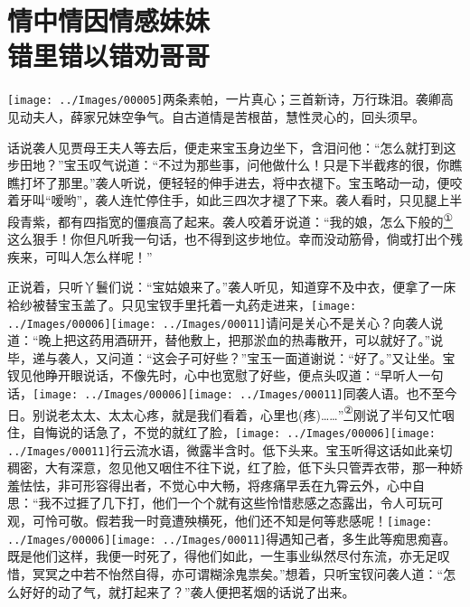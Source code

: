 

\chapter{情中情因情感妹妹\\错里错以错劝哥哥}\label{part0038_split_000.htmlux5cux23calibre_pb_0}

{\texttt{[image: ../Images/00005]}两条素帕，一片真心；三首新诗，万行珠泪。袭卿高见动夫人，薛家兄妹空争气。自古道情是苦根苗，慧性灵心的，回头须早。}

话说袭人见贾母王夫人等去后，便走来宝玉身边坐下，含泪问他：``怎么就打到这步田地？''宝玉叹气说道：``不过为那些事，问他做什么！只是下半截疼的很，你瞧瞧打坏了那里。''袭人听说，便轻轻的伸手进去，将中衣褪下。宝玉略动一动，便咬着牙叫``嗳哟''，袭人连忙停住手，如此三四次才褪了下来。袭人看时，只见腿上半段青紫，都有四指宽的僵痕高了起来。袭人咬着牙说道：``我的娘，怎么下般的\href{../Text/part0038_split_000.html\#lnkback_1_a}{\textsuperscript{①}}这么狠手！你但凡听我一句话，也不得到这步地位。幸而没动筋骨，倘或打出个残疾来，可叫人怎么样呢！''

正说着，只听丫鬟们说：``宝姑娘来了。''袭人听见，知道穿不及中衣，便拿了一床袷纱被替宝玉盖了。只见宝钗手里托着一丸药走进来，{\texttt{[image: ../Images/00006]}\texttt{[image: ../Images/00011]}\footnotesize \kaishu 请问是关心不是关心？}向袭人说道：``晚上把这药用酒研开，替他敷上，把那淤血的热毒散开，可以就好了。''说毕，递与袭人，又问道：``这会子可好些？''宝玉一面道谢说：``好了。''又让坐。宝钗见他睁开眼说话，不像先时，心中也宽慰了好些，便点头叹道：``早听人一句话，{\texttt{[image: ../Images/00006]}\texttt{[image: ../Images/00011]}\footnotesize \kaishu 同袭人语。}也不至今日。别说老太太、太太心疼，就是我们看着，心里也{(疼)}\ldots{}\ldots{}''\href{../Text/part0038_split_000.html\#lnkback_2_a}{\textsuperscript{②}}刚说了半句又忙咽住，自悔说的话急了，不觉的就红了脸，{\texttt{[image: ../Images/00006]}\texttt{[image: ../Images/00011]}\footnotesize \kaishu 行云流水语，微露半含时。}低下头来。宝玉听得这话如此亲切稠密，大有深意，忽见他又咽住不往下说，红了脸，低下头只管弄衣带，那一种娇羞怯怯，非可形容得出者，不觉心中大畅，将疼痛早丢在九霄云外，心中自思：``我不过捱了几下打，他们一个个就有这些怜惜悲感之态露出，令人可玩可观，可怜可敬。假若我一时竟遭殃横死，他们还不知是何等悲感呢！{\texttt{[image: ../Images/00006]}\texttt{[image: ../Images/00011]}\footnotesize \kaishu 得遇知己者，多生此等痴思痴喜。}既是他们这样，我便一时死了，得他们如此，一生事业纵然尽付东流，亦无足叹惜，冥冥之中若不怡然自得，亦可谓糊涂鬼祟矣。''想着，只听宝钗问袭人道：``怎么好好的动了气，就打起来了？''袭人便把茗烟的话说了出来。

